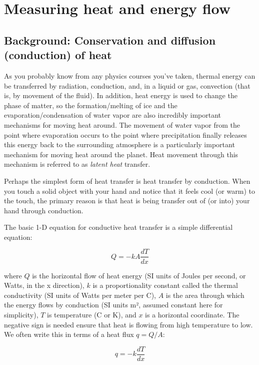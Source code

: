 \setchapterpreamble[u]{\margintoc}
\chapter{Measuring heat and energy flow}

\section{Background: Conservation and diffusion (conduction) of heat}

As you probably know from any physics courses you’ve taken, thermal energy can be transferred by radiation, conduction, and, in a liquid or gas, convection (that is, by movement of the fluid). In addition, heat energy is used to change the phase of matter, so the formation/melting of ice and the evaporation/condensation of water vapor are also incredibly important mechanisms for moving heat around. The movement of water vapor from the point where evaporation occurs to the point where precipitation finally releases this energy back to the surrounding atmosphere is a particularly important mechanism for moving heat around the planet. Heat movement through this mechanism is referred to as \emph{latent heat} transfer.

Perhaps the simplest form of heat transfer is heat transfer by conduction. When you touch a solid object with your hand and notice that it feels cool (or warm) to the touch, the primary reason is that heat is being transfer out of (or into) your hand through conduction.  

The basic 1-D equation for conductive heat transfer is a simple differential equation:

\begin{equation} \label{eq:conduction} 
Q =-kA\frac{dT}{dx}
\end{equation}

where $Q$ is the horizontal flow of heat energy (SI units of Joules per second, or Watts, in the x direction), $k$ is a proportionality constant called the thermal conductivity (SI units of Watts per meter per \textdegree C), $A$ is the area through which the energy flows by conduction (SI units m², assumed constant here for simplicity), $T$ is temperature (\textdegree C or K), and $x$ is a horizontal coordinate.  The negative sign is needed ensure that heat is flowing from high temperature to low.  We often write this in terms of a heat flux $q=Q/A$:

\begin{equation} \label{eq:heatflux} 
q =-k\frac{dT}{dx}
\end{equation}

